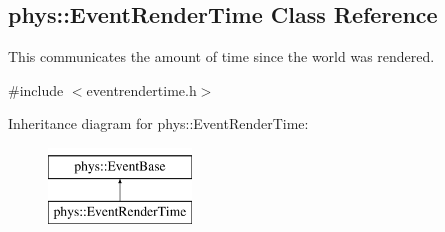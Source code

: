 \hypertarget{classphys_1_1EventRenderTime}{
\subsection{phys::EventRenderTime Class Reference}
\label{classphys_1_1EventRenderTime}
}


This communicates the amount of time since the world was rendered.  




{\ttfamily \#include $<$eventrendertime.h$>$}

Inheritance diagram for phys::EventRenderTime:\begin{figure}[H]
\begin{center}
\leavevmode
\includegraphics[height=2.000000cm]{classphys_1_1EventRenderTime}
\end{center}
\end{figure}
